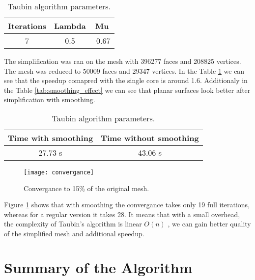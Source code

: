 \begin{table}[h!]
\centering
\begin{tabular}{ |c|c|c| } 
 \hline
 Iterations & Lambda & Mu\\
 \hline
 7 & 0.5 & -0.67\\ 
 \hline
\end{tabular}
\caption{Taubin algorithm parameters.}
\end{table}

The simplification was ran on the mesh with 396277 faces and 208825 vertices. The mesh was reduced to 50009 faces and 29347 vertices. In the Table \ref{fig:time_speedup} we can see that the speedup comapred with the single core is around 1.6. Additionaly in the Table \ref{tab:smoothing_effect} we can see that planar surfaces look better after simplification with smoothing.

\begin{table}[h!]
\centering
\begin{tabular}{ |c|c| } 
 \hline
 Time with smoothing & Time without smoothing\\
 \hline
 27.73 s & 43.06 s\\ 
 \hline
\end{tabular}
\caption{Taubin algorithm parameters.}
\label{fig:time_speedup}
\end{table}

\begin{figure}[h!]
  \begin{center}
    \texttt{[image: convergance]}
    \caption{Convergance to 15\% of the original mesh.}
    \label{fig:convergance}
  \end{center}
\end{figure}

Figure \ref{fig:convergance} shows that with smoothing the convergance takes only 19 full iterations, whereas for a regular version it takes 28. It means that with a small overhead, the complexity of Taubin's algorithm is linear $O(n)$ \cite{taubin95}, we can gain better quality of the simplified mesh and additional speedup.

\newpage
\section{Summary of the Algorithm}

